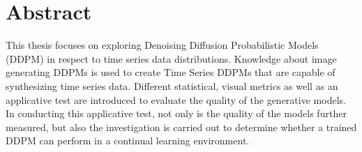 \chapter*{Abstract}


\setcounter{zusammen_seitenzahl}{\value{page}}

This thesis focuses on exploring Denoising Diffusion Probabilistic Models (DDPM) in respect to time series data distributions. 
Knowledge about image generating DDPMs is used to create Time Series DDPMs that are capable of synthesizing time series data. Different statistical, visual metrics as well as an applicative test are introduced to evaluate the quality of the generative models. In conducting this applicative test, not only is the quality of the models further measured, but also the investigation is carried out to determine whether a trained DDPM can perform in a continual learning environment.
